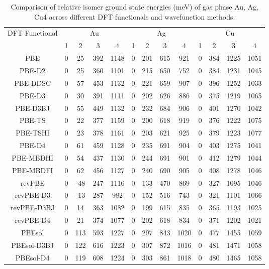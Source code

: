 \begin{table}[ht]
\centering
\caption{Comparison of relative isomer ground state energies (meV) of gas phase Au, Ag, Cu4 across different DFT functionals and wavefunction methods.}
\begin{tabular}{ccccccccccccc}
\hline\hline
DFT Functional & \multicolumn{4}{c}{Au} & \multicolumn{4}{c}{Ag} & \multicolumn{4}{c}{Cu} \\ 
\cline{2-13}
 & 1 & 2 & 3 & 4 & 1 & 2 & 3 & 4 & 1 & 2 & 3 & 4 \\ \hline
PBE & 0 & 25 & 392 & 1148 & 0 & 201 & 615 & 921 & 0 & 384 & 1225 & 1051 \\ 
PBE-D2 & 0 & 25 & 360 & 1101 & 0 & 215 & 650 & 752 & 0 & 384 & 1231 & 1045 \\ 
PBE-DDSC & 0 & 57 & 453 & 1132 & 0 & 221 & 659 & 907 & 0 & 396 & 1252 & 1033 \\ 
PBE-D3 & 0 & 30 & 391 & 1111 & 0 & 202 & 626 & 886 & 0 & 375 & 1219 & 1065 \\ 
PBE-D3BJ & 0 & 55 & 449 & 1132 & 0 & 232 & 684 & 906 & 0 & 401 & 1270 & 1042 \\ 
PBE-TS & 0 & 22 & 377 & 1159 & 0 & 200 & 618 & 919 & 0 & 376 & 1222 & 1075 \\ 
PBE-TSHI & 0 & 23 & 378 & 1161 & 0 & 203 & 621 & 925 & 0 & 379 & 1223 & 1077 \\ 
PBE-D4 & 0 & 61 & 459 & 1128 & 0 & 235 & 691 & 904 & 0 & 403 & 1275 & 1041 \\ 
PBE-MBDHI & 0 & 54 & 437 & 1130 & 0 & 244 & 691 & 901 & 0 & 412 & 1279 & 1044 \\ 
PBE-MBDFI & 0 & 62 & 456 & 1127 & 0 & 240 & 690 & 905 & 0 & 408 & 1278 & 1046 \\ 
revPBE & 0 & -48 & 247 & 1116 & 0 & 133 & 470 & 869 & 0 & 327 & 1095 & 1046 \\ 
revPBE-D3 & 0 & -13 & 287 & 982 & 0 & 152 & 516 & 743 & 0 & 321 & 1101 & 1066 \\ 
revPBE-D3BJ & 0 & 14 & 363 & 1082 & 0 & 199 & 615 & 835 & 0 & 365 & 1193 & 1025 \\ 
revPBE-D4 & 0 & 21 & 374 & 1077 & 0 & 202 & 618 & 834 & 0 & 371 & 1202 & 1021 \\ 
PBEsol & 0 & 113 & 593 & 1227 & 0 & 297 & 843 & 1020 & 0 & 477 & 1455 & 1059 \\ 
PBEsol-D3BJ & 0 & 122 & 616 & 1223 & 0 & 307 & 872 & 1016 & 0 & 481 & 1471 & 1058 \\ 
PBEsol-D4 & 0 & 119 & 608 & 1224 & 0 & 303 & 861 & 1018 & 0 & 480 & 1465 & 1058 \\ 

\end{tabular}
\end{table}
